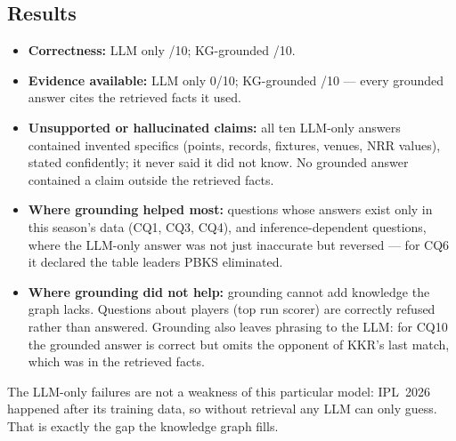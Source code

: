 \subsection{Results}
\begin{itemize}
  \item \textbf{Correctness:} LLM only \evalA/10; KG-grounded \evalB/10.
  \item \textbf{Evidence available:} LLM only 0/10; KG-grounded \evidB/10 --- every grounded answer cites the
        retrieved facts it used.
  \item \textbf{Unsupported or hallucinated claims:} all ten LLM-only answers contained invented specifics
        (points, records, fixtures, venues, NRR values), stated confidently; it never said it did not know. No
        grounded answer contained a claim outside the retrieved facts.
  \item \textbf{Where grounding helped most:} questions whose answers exist only in this season's data (CQ1,
        CQ3, CQ4), and inference-dependent questions, where the LLM-only answer was not just inaccurate but
        reversed --- for CQ6 it declared the table leaders PBKS eliminated.
  \item \textbf{Where grounding did not help:} grounding cannot add knowledge the graph lacks. Questions about
        players (top run scorer) are correctly refused rather than answered. Grounding also leaves phrasing to
        the LLM: for CQ10 the grounded answer is correct but omits the opponent of KKR's last match, which was
        in the retrieved facts.
\end{itemize}
The LLM-only failures are not a weakness of this particular model: IPL~2026 happened after its training data,
so without retrieval any LLM can only guess. That is exactly the gap the knowledge graph fills.
